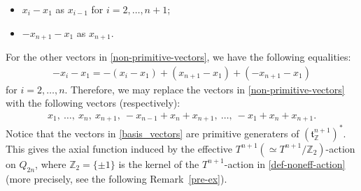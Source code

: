 \documentclass[12pt]{amsart}
\theoremstyle{remark}
\numberwithin{equation}{section}
\begin{document}
\begin{itemize}
\item $x_{i}-x_{1}$ as $x_{i-1}$ for $i=2,\ldots, n+1$;
\item $-x_{n+1}-x_{1}$ as $x_{n+1}$.
\end{itemize}
For the other vectors in \eqref{non-primitive-vectors},  we have the following equalities:
\begin{align*}
-x_{i}-x_{1}=-(x_{i}-x_{1})+(x_{n+1}-x_{1})+(-x_{n+1}-x_{1})
\end{align*}
for $i=2,\ldots, n$.
Therefore,  
we may replace the 
vectors in \eqref{non-primitive-vectors} with the following vectors (respectively):
\begin{align}
\label{basis_vectors}
x_{1},\ \ldots,\ x_{n},\ x_{n+1},\ -x_{n-1}+x_{n}+x_{n+1},\ \ldots,\ -x_{1}+x_{n}+x_{n+1}.
\end{align}
Notice that the vectors in \eqref{basis_vectors} are primitive generaters of $(\mathfrak{t}_{\mathbb{Z}}^{n+1})^{*}$.
This gives the axial function induced by the effective $T^{n+1}(\simeq T^{n+1}/\mathbb{Z}_{2})$-action on $Q_{2n}$, where $\mathbb{Z}_{2}=\{\pm 1\}$ is the kernel of the $T^{n+1}$-action in \eqref{def-noneff-action} (more precisely, see the following Remark~\ref{pre-ex}).
\end{document}
